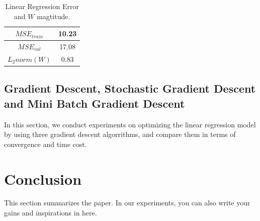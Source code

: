 \documentclass[journal, a4paper]{IEEEtran}
\begin{document}
\begin{table}[!hbt]
	\begin{center}
		\caption{Linear Regression Error and $W$ magtitude.}
		\label{tab:Linear_Regression}
		\begin{tabular}{|c|c|}
			\hline
			$MSE_{train}$ & 10.23    \\
			\hline
			$MSE_{val}$ & 17.08    \\
			\hline
			$L_2norm(W)$ & 0.83  \\
			\hline
		\end{tabular}
	\end{center}
\end{table}

\subsection{Gradient Descent, Stochastic Gradient Descent and Mini Batch Gradient Descent}
In this section, we conduct experiments on optimizing the linear regression model by using three gradient descent algorrithms, and compare them in terms of convergence and time cost.

\section{Conclusion}
	This section summarizes the paper. In our experiments, you can also write your gains and inspirations in here.



\end{document}
